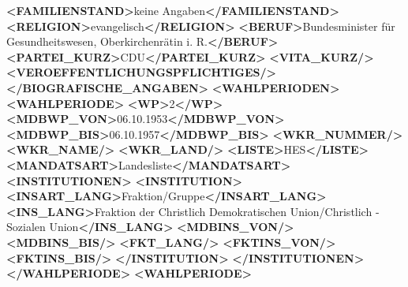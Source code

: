 \documentclass[12pt]{article}
\newenvironment{Shaded}{\begin{snugshade}}{\end{snugshade}}
\newcommand{\KeywordTok}[1]{\textcolor[rgb]{0.13,0.29,0.53}{\textbf{#1}}}
\newcommand{\NormalTok}[1]{#1}
\begin{document}
{\begin{Shaded}
\begin{Highlighting}[]
      \KeywordTok{\textless{}FAMILIENSTAND\textgreater{}}\NormalTok{keine Angaben}\KeywordTok{\textless{}/FAMILIENSTAND\textgreater{}}
      \KeywordTok{\textless{}RELIGION\textgreater{}}\NormalTok{evangelisch}\KeywordTok{\textless{}/RELIGION\textgreater{}}
      \KeywordTok{\textless{}BERUF\textgreater{}}\NormalTok{Bundesminister für Gesundheitswesen, Oberkirchenrätin i. R.}\KeywordTok{\textless{}/BERUF\textgreater{}}
      \KeywordTok{\textless{}PARTEI\_KURZ\textgreater{}}\NormalTok{CDU}\KeywordTok{\textless{}/PARTEI\_KURZ\textgreater{}}
      \KeywordTok{\textless{}VITA\_KURZ/\textgreater{}}
      \KeywordTok{\textless{}VEROEFFENTLICHUNGSPFLICHTIGES/\textgreater{}}
    \KeywordTok{\textless{}/BIOGRAFISCHE\_ANGABEN\textgreater{}}
    \KeywordTok{\textless{}WAHLPERIODEN\textgreater{}}
      \KeywordTok{\textless{}WAHLPERIODE\textgreater{}}
        \KeywordTok{\textless{}WP\textgreater{}}\NormalTok{2}\KeywordTok{\textless{}/WP\textgreater{}}
        \KeywordTok{\textless{}MDBWP\_VON\textgreater{}}\NormalTok{06.10.1953}\KeywordTok{\textless{}/MDBWP\_VON\textgreater{}}
        \KeywordTok{\textless{}MDBWP\_BIS\textgreater{}}\NormalTok{06.10.1957}\KeywordTok{\textless{}/MDBWP\_BIS\textgreater{}}
        \KeywordTok{\textless{}WKR\_NUMMER/\textgreater{}}
        \KeywordTok{\textless{}WKR\_NAME/\textgreater{}}
        \KeywordTok{\textless{}WKR\_LAND/\textgreater{}}
        \KeywordTok{\textless{}LISTE\textgreater{}}\NormalTok{HES}\KeywordTok{\textless{}/LISTE\textgreater{}}
        \KeywordTok{\textless{}MANDATSART\textgreater{}}\NormalTok{Landesliste}\KeywordTok{\textless{}/MANDATSART\textgreater{}}
        \KeywordTok{\textless{}INSTITUTIONEN\textgreater{}}
          \KeywordTok{\textless{}INSTITUTION\textgreater{}}
            \KeywordTok{\textless{}INSART\_LANG\textgreater{}}\NormalTok{Fraktion/Gruppe}\KeywordTok{\textless{}/INSART\_LANG\textgreater{}}
            \KeywordTok{\textless{}INS\_LANG\textgreater{}}\NormalTok{Fraktion der Christlich Demokratischen Union/Christlich {-} Sozialen Union}\KeywordTok{\textless{}/INS\_LANG\textgreater{}}
            \KeywordTok{\textless{}MDBINS\_VON/\textgreater{}}
            \KeywordTok{\textless{}MDBINS\_BIS/\textgreater{}}
            \KeywordTok{\textless{}FKT\_LANG/\textgreater{}}
            \KeywordTok{\textless{}FKTINS\_VON/\textgreater{}}
            \KeywordTok{\textless{}FKTINS\_BIS/\textgreater{}}
          \KeywordTok{\textless{}/INSTITUTION\textgreater{}}
        \KeywordTok{\textless{}/INSTITUTIONEN\textgreater{}}
      \KeywordTok{\textless{}/WAHLPERIODE\textgreater{}}
      \KeywordTok{\textless{}WAHLPERIODE\textgreater{}}

\end{Highlighting}
\end{Shaded}}
\end{document}
